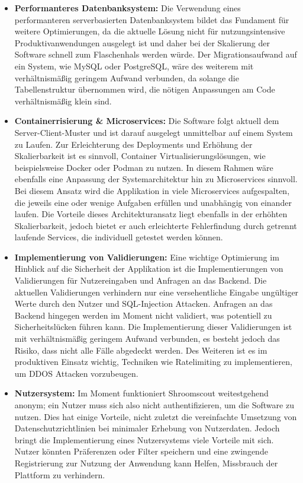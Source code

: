 \documentclass[../main.tex]{subfiles}
\begin{document}
\begin{itemize}

	\item \textbf{Performanteres Datenbanksystem:}
	      Die Verwendung eines performanteren serverbasierten Datenbanksystem bildet das Fundament für weitere Optimierungen, da die aktuelle Lösung nicht für
	      nutzungsintensive Produktivanwendungen ausgelegt ist und daher bei der Skalierung der Software schnell zum Flaschenhals werden würde. Der Migrationsaufwand
	      auf ein System, wie MySQL oder PostgreSQL, wäre des weiterem mit verhältnismäßig geringem Aufwand verbunden, da solange die Tabellenstruktur übernommen wird,
	      die nötigen Anpassungen am Code verhältnismäßig klein sind.

	\item \textbf{Containerrisierung \& Microservices:}
	      Die Software folgt aktuell dem Server-Client-Muster und ist darauf ausgelegt unmittelbar auf einem System zu Laufen. Zur Erleichterung des Deployments und
	      Erhöhung der Skalierbarkeit ist es sinnvoll, Container Virtualisierungslösungen, wie beispielsweise Docker oder Podman zu nutzen. In diesem Rahmen wäre ebenfalls
	      eine Anpassung der Systemarchitektur hin zu Microservices sinnvoll. Bei diesem Ansatz wird die Applikation in viele Microservices aufgespalten, die jeweils eine
	      oder wenige Aufgaben erfüllen und unabhängig von einander laufen. Die Vorteile dieses Architekturansatz liegt ebenfalls in der erhöhten Skalierbarkeit, jedoch
	      bietet er auch erleichterte Fehlerfindung durch getrennt laufende Services, die individuell getestet werden können.

	\item \textbf{Implementierung von Validierungen:}
	      Eine wichtige Optimierung im Hinblick auf die Sicherheit der Applikation ist die Implementierungen von Validierungen für Nutzereingaben und Anfragen an das Backend.
	      Die aktuellen Validierungen verhindern nur eine versehentliche Eingabe ungültiger Werte durch den Nutzer und SQL-Injection Attacken. Anfragen an das Backend hingegen
	      werden im Moment nicht validiert, was potentiell zu Sicherheitslücken führen kann. Die Implementierung dieser Validierungen ist mit verhältnismäßig geringem Aufwand
	      verbunden, es besteht jedoch das Risiko, dass nicht alle Fälle abgedeckt werden. Des Weiteren ist es im produktiven Einsatz wichtig, Techniken wie Ratelimiting zu
	      implementieren, um DDOS Attacken vorzubeugen.

	\item \textbf{Nutzersystem:}
	      Im Moment funktioniert Shroomscout weitestgehend anonym; ein Nutzer muss sich also nicht authentifizieren, um die Software zu nutzen. Dies hat einige Vorteile,
	      nicht zuletzt die vereinfachte Umsetzung von Datenschutzrichtlinien bei minimaler Erhebung von Nutzerdaten. Jedoch bringt die Implementierung eines Nutzersystems
	      viele Vorteile mit sich. Nutzer könnten Präferenzen oder Filter speichern und eine zwingende Registrierung zur Nutzung der Anwendung kann Helfen, Missbrauch der
	      Plattform zu verhindern.


\end{itemize}
\end{document}
